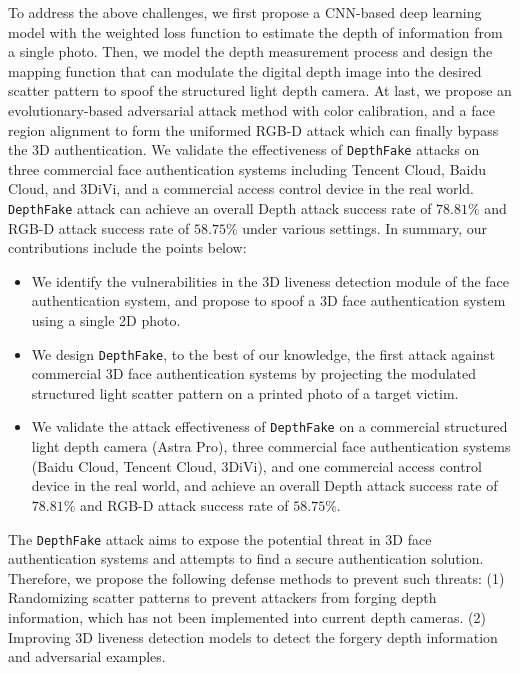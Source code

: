 To address the above challenges, we first propose a CNN-based deep learning model with the weighted loss function to estimate the depth of information from a single photo.
Then, we model the depth measurement process and design the mapping function that can modulate the digital depth image into the desired scatter pattern to spoof the structured light depth camera.
At last, we propose an evolutionary-based adversarial attack method with color calibration, and a face region alignment to form the uniformed RGB-D attack which can finally bypass the 3D authentication.
We validate the effectiveness of \texttt{DepthFake} attacks on three commercial face authentication systems including Tencent Cloud, Baidu Cloud, and 3DiVi, and a commercial access control device in the real world. \texttt{DepthFake} attack can achieve an overall Depth attack success rate of $78.81\%$ and RGB-D attack success rate of $58.75\%$ under various settings. In summary, our contributions include the points below:
\begin{itemize}	
	\item We identify the vulnerabilities in the 3D liveness detection module of the face authentication system, and propose to spoof a 3D  face authentication system using a single 2D photo.	
	\item We design \texttt{DepthFake},  to the best of our knowledge, the first attack against commercial 3D face authentication systems by projecting the modulated structured light scatter pattern on a printed photo of a target victim.	
	\item We validate the attack effectiveness of \texttt{DepthFake} on a commercial structured light depth camera (Astra Pro), three commercial face authentication systems (Baidu Cloud, Tencent Cloud, 3DiVi), and one commercial access control device in the real world, and achieve an overall Depth attack success rate of $78.81\%$ and RGB-D attack success rate of $58.75\%$.
\end{itemize}

The \texttt{DepthFake} attack aims to expose the potential threat in 3D face authentication systems and attempts to find a secure authentication solution. Therefore, we propose the following defense methods to prevent such threats:
(1) Randomizing scatter patterns to prevent attackers from forging depth information, which has not been implemented into current depth cameras.
(2) Improving 3D liveness detection models to detect the forgery depth information and adversarial examples.



